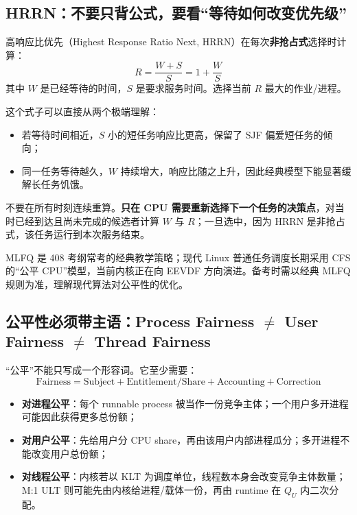 \documentclass[11pt,a4paper]{ctexart}
\newcommand{\kw}[1]{\textbf{#1}}
\begin{document}
\subsection{HRRN：不要只背公式，要看“等待如何改变优先级”}

高响应比优先（Highest Response Ratio Next, HRRN）在每次\kw{非抢占式}选择时计算：
\[
\boxed{
R=\frac{W+S}{S}=1+\frac{W}{S}
}
\]
其中 $W$ 是已经等待的时间，$S$ 是要求服务时间。选择当前 $R$ 最大的作业/进程。

这个式子可以直接从两个极端理解：
\begin{itemize}
\item 若等待时间相近，$S$ 小的短任务响应比更高，保留了 SJF 偏爱短任务的倾向；
\item 同一任务等待越久，$W$ 持续增大，响应比随之上升，因此经典模型下能显著缓解长任务饥饿。
\end{itemize}

\begin{exam}
不要在所有时刻连续重算。\kw{只在 CPU 需要重新选择下一个任务的决策点}，对当时已经到达且尚未完成的候选者计算 $W$ 与 $R$；一旦选中，因为 HRRN 是非抢占式，该任务运行到本次服务结束。
\end{exam}

\begin{warn}
MLFQ 是 408 考纲常考的经典教学策略；现代 Linux 普通任务调度长期采用 CFS 的“公平 CPU”模型，当前内核正在向 EEVDF 方向演进。备考时需以经典 MLFQ 规则为准，理解现代算法对公平性的优化。
\end{warn}

\subsection{公平性必须带主语：Process Fairness $\neq$ User Fairness $\neq$ Thread Fairness}

“公平”不能只写成一个形容词。它至少需要：
\[
\boxed{\text{Fairness}=\text{Subject}+\text{Entitlement/Share}+\text{Accounting}+\text{Correction}}
\]
\begin{itemize}
\item \kw{对进程公平}：每个 runnable process 被当作一份竞争主体；一个用户多开进程可能因此获得更多总份额；
\item \kw{对用户公平}：先给用户分 CPU share，再由该用户内部进程瓜分；多开进程不能改变用户总份额；
\item \kw{对线程公平}：内核若以 KLT 为调度单位，线程数本身会改变竞争主体数量；M:1 ULT 则可能先由内核给进程/载体一份，再由 runtime 在 $Q_U$ 内二次分配。
\end{itemize}
\end{document}
